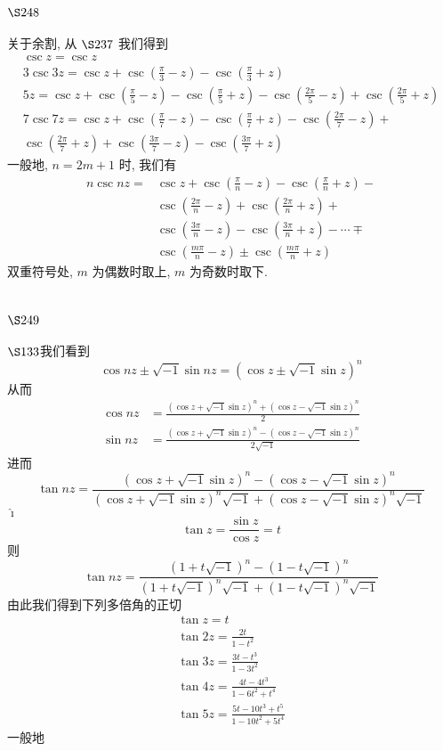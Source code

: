 \section{$\S 248$}

关于余割, 从 $\S 237$ 我们得到
\[
\begin{gathered}
\csc z=\csc z \\
3 \csc 3 z=\csc z+\csc \left(\frac{\pi}{3}-z\right)-\csc \left(\frac{\pi}{3}+z\right) \\
5 z=\csc z+\csc \left(\frac{\pi}{5}-z\right)-\csc \left(\frac{\pi}{5}+z\right)-\csc \left(\frac{2 \pi}{5}-z\right)+\csc \left(\frac{2 \pi}{5}+z\right) \\
7 \csc 7 z=\csc z+\csc \left(\frac{\pi}{7}-z\right)-\csc \left(\frac{\pi}{7}+z\right)-\csc \left(\frac{2 \pi}{7}-z\right)+ \\
\csc \left(\frac{2 \pi}{7}+z\right)+\csc \left(\frac{3 \pi}{7}-z\right)-\csc \left(\frac{3 \pi}{7}+z\right)
\end{gathered}
\]
一般地, $n=2 m+1$ 时, 我们有
\[
\begin{aligned}
n \csc n z= & \csc z+\csc \left(\frac{\pi}{n}-z\right)-\csc \left(\frac{\pi}{n}+z\right)- \\
& \csc \left(\frac{2 \pi}{n}-z\right)+\csc \left(\frac{2 \pi}{n}+z\right)+ \\
& \csc \left(\frac{3 \pi}{n}-z\right)-\csc \left(\frac{3 \pi}{n}+z\right)-\cdots \mp \\
& \csc \left(\frac{m \pi}{n}-z\right) \pm \csc \left(\frac{m \pi}{n}+z\right)
\end{aligned}
\]
双重符号处, $m$ 为偶数时取上, $m$ 为奇数时取下.

\section{$\S 249$}

$\S 133$我们看到
\[
\cos n z \pm \sqrt{-1} \sin n z=(\cos z \pm \sqrt{-1} \sin z)^{n}
\]
从而
\[
\begin{aligned}
\cos n z & =\frac{(\cos z+\sqrt{-1} \sin z)^{n}+(\cos z-\sqrt{-1} \sin z)^{n}}{2} \\
\sin n z & =\frac{(\cos z+\sqrt{-1} \sin z)^{n}-(\cos z-\sqrt{-1} \sin z)^{n}}{2 \sqrt{-1}}
\end{aligned}
\]
进而 
\[
\tan n z=\frac{(\cos z+\sqrt{-1} \sin z)^{n}-(\cos z-\sqrt{-1} \sin z)^{n}}{(\cos z+\sqrt{-1} \sin z)^{n} \sqrt{-1}+(\cos z-\sqrt{-1} \sin z)^{n} \sqrt{-1}}
\]
$\hat{\imath}$
\[
\tan z=\frac{\sin z}{\cos z}=t
\]
则
\[
\tan n z=\frac{(1+t \sqrt{-1})^{n}-(1-t \sqrt{-1})^{n}}{(1+t \sqrt{-1})^{n} \sqrt{-1}+(1-t \sqrt{-1})^{n} \sqrt{-1}}
\]
由此我们得到下列多倍角的正切
\[
\begin{gathered}
\tan z=t \\
\tan 2 z=\frac{2 t}{1-t^{2}} \\
\tan 3 z=\frac{3 t-t^{3}}{1-3 t^{2}} \\
\tan 4 z=\frac{4 t-4 t^{3}}{1-6 t^{2}+t^{4}} \\
\tan 5 z=\frac{5 t-10 t^{3}+t^{5}}{1-10 t^{2}+5 t^{4}}
\end{gathered}
\]
一般地

